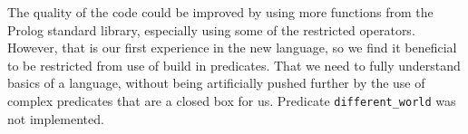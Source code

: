 \documentclass[11pt, a4paper]{article}
\begin{document}
The quality of the code could be improved by using more functions from the Prolog standard library, especially using some of the restricted operators.  However, that is our first experience in the new language, so we find it beneficial to be restricted from use of build in predicates. That we need to fully understand basics of a language, without being artificially pushed further by the use of complex predicates that are a closed box for us.  Predicate \texttt{different\_world} was not implemented.
\end{document}
